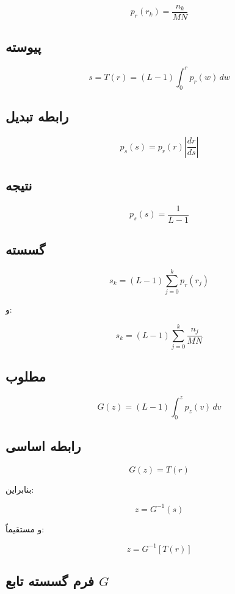 \documentclass[12pt,a4paper]{article}
\begin{document}
	\[
	\boxed{
		p_r(r_k)=\frac{n_k}{MN}
	}
	\]
	
	\subsection{ پیوسته}
	
	\[
	\boxed{
		s=T(r)
		=
		(L-1)
		\int_0^r p_r(w)\,dw
	}
	\]
	
	\subsection{رابطه تبدیل }
	
	\[
	\boxed{
		p_s(s)
		=
		p_r(r)
		\left|
		\frac{dr}{ds}
		\right|
	}
	\]
	
	\subsection{نتیجه }
	
	\[
	\boxed{
		p_s(s)=\frac{1}{L-1}
	}
	\]
	
	\subsection{ گسسته}
	
	\[
	\boxed{
		s_k
		=
		(L-1)
		\sum_{j=0}^{k}p_r(r_j)
	}
	\]
	
	و:
	
	\[
	\boxed{
		s_k
		=
		(L-1)
		\sum_{j=0}^{k}
		\frac{n_j}{MN}
	}
	\]
	
	\subsection{ مطلوب}
	
	\[
	\boxed{
		G(z)
		=
		(L-1)
		\int_0^z p_z(v)\,dv
	}
	\]
	
	\subsection{رابطه اساسی }
	
	\[
	\boxed{
		G(z)=T(r)
	}
	\]
	
	بنابراین:
	
	\[
	\boxed{
		z=G^{-1}(s)
	}
	\]
	
	و مستقیماً:
	
	\[
	\boxed{
		z=G^{-1}[T(r)]
	}
	\]
	
	\subsection{فرم گسسته تابع $G$}
	
\end{document}
